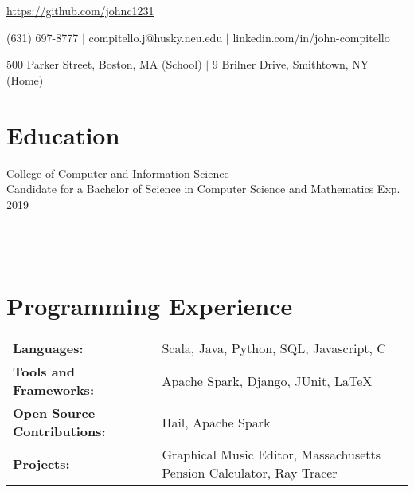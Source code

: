 \documentclass[12pt]{john_resume}
\begin{document}
\centerline{\url{https://github.com/johnc1231}}
\centerline{(631) 697-8777 $|$ compitello.j@husky.neu.edu $|$ linkedin.com/in/john-compitello}
\centerline{500 Parker Street, Boston, MA (School) $|$ 9 Brilner Drive, Smithtown, NY (Home)}

\section{Education}
College of Computer and Information Science\\
Candidate for a Bachelor of Science in Computer Science and Mathematics \hspace*{\fill} Exp. 2019 \\
 \\
\\
 \\

\section{Programming Experience}
\begin{tabular}{l l}
\textbf{Languages:} & Scala, Java, Python, SQL, Javascript, C\\
\textbf{Tools and Frameworks:} & Apache Spark, Django, JUnit, LaTeX \\
\textbf{Open Source Contributions:} & Hail, Apache Spark \\
\textbf{Projects:} & Graphical Music Editor, Massachusetts Pension Calculator, Ray Tracer
\end{tabular}
\end{document}
